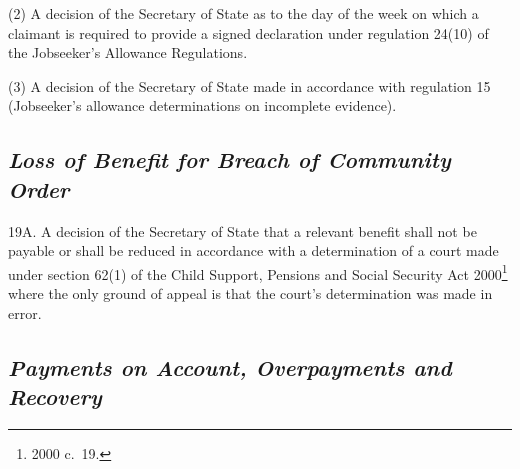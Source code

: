 \documentclass[12pt,a4paper]{article}
\begin{document}
(2) A decision of the Secretary of State as to the day of the week on which a claimant is required to provide a signed declaration under regulation 24(10) of the Jobseeker’s Allowance Regulations.

(3) A decision of the Secretary of State 
made in accordance with regulation 15 (Jobseeker’s allowance determinations on incomplete evidence).


\subsection*{\itshape Loss of Benefit for Breach of Community Order}

19A.  A decision of the Secretary of State that a relevant benefit shall not be payable or shall be reduced in accordance with a determination of a court made under section 62(1) of the Child Support, Pensions and Social Security Act 2000\footnote{2000 c.\ 19.} where the only ground of appeal is that the court’s determination was made in error.


\subsection*{\itshape Payments on Account, Overpayments and Recovery}
\end{document}
